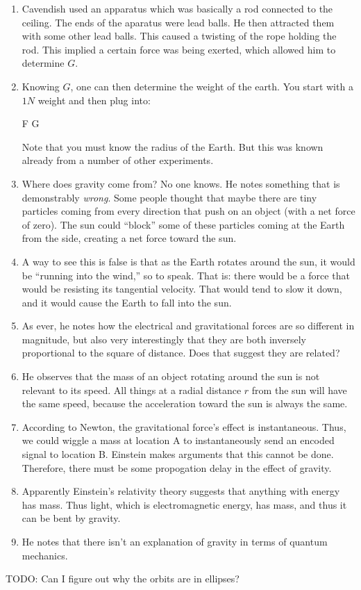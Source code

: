 \begin{enumerate}
  \item Cavendish used an apparatus which was basically a rod connected
  to the ceiling. The ends of the aparatus were lead balls. He then
  attracted them with some other lead balls. This caused a twisting of
  the rope holding the rod. This implied a certain force was being
  exerted, which allowed him to determine $G$.

  \item Knowing $G$, one can then determine the weight of the earth. You
  start with a $1N$ weight and then plug into:

  \begin{nedqn}
    F
  \eqcol
    G 
  \end{nedqn}

  Note that you must know the radius of the Earth. But this was known
  already from a number of other experiments.

  \item Where does gravity come from? No one knows. He notes something
  that is demonstrably \emph{wrong}. Some people thought that maybe
  there are tiny particles coming from every direction that push on an
  object (with a net force of zero). The sun could ``block'' some of
  these particles coming at the Earth from the side, creating a net
  force toward the sun.

  \item A way to see this is false is that as the Earth rotates around
  the sun, it would be ``running into the wind,'' so to speak. That is:
  there would be a force that would be resisting its tangential
  velocity. That would tend to slow it down, and it would cause the
  Earth to fall into the sun.

  \item As ever, he notes how the electrical and gravitational forces
  are so different in magnitude, but also very interestingly that they
  are both inversely proportional to the square of distance. Does that
  suggest they are related?

  \item He observes that the mass of an object rotating around the sun
  is not relevant to its speed. All things at a radial distance $r$ from
  the sun will have the same speed, because the acceleration toward the
  sun is always the same.

  \item According to Newton, the gravitational force's effect is
  instantaneous. Thus, we could wiggle a mass at location A to
  instantaneously send an encoded signal to location B. Einstein makes
  arguments that this cannot be done. Therefore, there must be some
  propogation delay in the effect of gravity.

  \item Apparently Einstein's relativity theory suggests that anything
  with energy has mass. Thus light, which is electromagnetic energy, has
  mass, and thus it can be bent by gravity.

  \item He notes that there isn't an explanation of gravity in terms of
  quantum mechanics.

\end{enumerate}

TODO: Can I figure out why the orbits are in ellipses?
